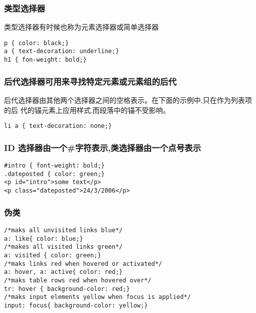 \documentclass[11pt]{article}
\begin{document}
\subsubsection{类型选择器}
\label{sec-4.1.1}

    类型选择器有时候也称为元素选择器或简单选择器

\begin{verbatim}
p { color: black;}
a { text-decoration: underline;}
h1 { fon-weight: bold;}

\end{verbatim}


\subsubsection{后代选择器可用来寻找特定元素或元素组的后代}
\label{sec-4.1.2}

    后代选择器由其他两个选择器之间的空格表示。在下面的示例中,只在作为列表项的后
    代的锚元素上应用样式,而段落中的锚不受影响。

\begin{verbatim}
li a { text-decoration: none;}

\end{verbatim}


\subsubsection{ID 选择器由一个\#字符表示,类选择器由一个点号表示}
\label{sec-4.1.3}


\begin{verbatim}
#intro { font-weight: bold;}
.dateposted { color: green;}
<p id="intro">some text</p>
<p class="dateposted">24/3/2006</p>

\end{verbatim}


\subsubsection{伪类}
\label{sec-4.1.4}


\begin{verbatim}
/*maks all unvisited links blue*/
a: like{ color: blue;}
/*makes all visited links green*/
a: visited { color: green;}
/*maks links red when hovered or activated*/
a: hover, a: active{ color: red;}
/*maks table rows red when hovered over*/
tr: hover { background-color: red;}
/*maks input elements yellow when focus is applied*/
input: focus{ background-color: yellow;}

\end{verbatim}
\end{document}
